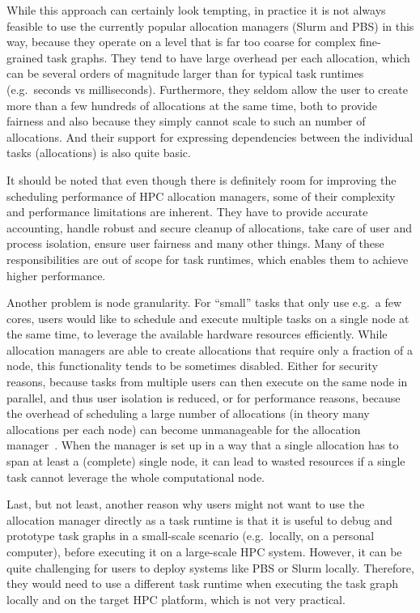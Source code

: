 While this approach can certainly look tempting, in practice it is not always feasible to use the
currently popular allocation managers (Slurm and PBS) in this way, because they operate on a level
that is far too coarse for complex fine-grained task graphs. They tend to have large overhead per
each allocation, which can be several orders of magnitude larger than for typical task runtimes
(e.g.\ seconds vs milliseconds). Furthermore, they seldom allow the user to create more than a few
hundreds of allocations at the same time, both to provide fairness and also because they simply
cannot scale to such an number of allocations. And their support for expressing dependencies
between the individual tasks (allocations) is also quite basic.

It should be noted that even though there is definitely room for improving the scheduling
performance of HPC allocation managers, some of their complexity and performance limitations are
inherent. They have to provide accurate accounting, handle robust and secure cleanup of
allocations, take care of user and process isolation, ensure user fairness and many other things.
Many of these responsibilities are out of scope for task runtimes, which enables them to achieve
higher performance.

Another problem is node granularity. For ``small'' tasks that only use e.g.\ a few cores, users
would like to schedule and execute multiple tasks on a single node at the same time, to leverage
the available hardware resources efficiently. While allocation managers are able to create
allocations that require only a fraction of a node, this functionality tends to be sometimes
disabled. Either for security reasons, because tasks from multiple users can then execute on the
same node in parallel, and thus user isolation is reduced, or for performance reasons, because the
overhead of scheduling a large number of allocations (in theory many allocations per each node) can
become unmanageable for the allocation manager~\cite{it4i_node_scheduling_policy}. When the manager is set
up in a way that a single allocation has to span at least a (complete) single node, it can lead to
wasted resources if a single task cannot leverage the whole computational node.

Last, but not least, another reason why users might not want to use the allocation manager directly
as a task runtime is that it is useful to debug and prototype task graphs in a small-scale scenario
(e.g.\ locally, on a personal computer), before executing it on a large-scale HPC system. However,
it can be quite challenging for users to deploy systems like PBS or Slurm locally. Therefore, they
would need to use a different task runtime when executing the task graph locally and on the target
HPC platform, which is not very practical.

